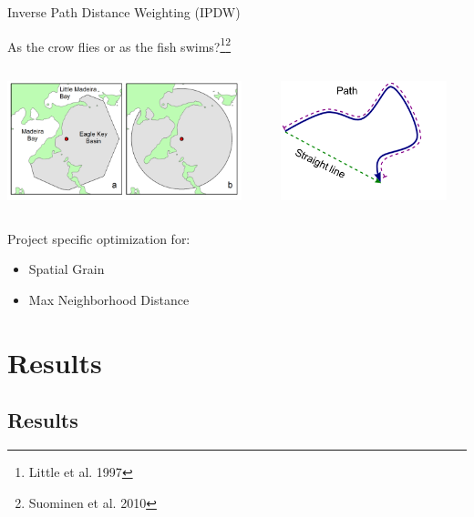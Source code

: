 \documentclass[compress,noflama,nosectionpages]{beamer}
\begin{document}
\begin{frame}{Inverse Path Distance Weighting (IPDW)}

As the crow flies or as the fish swims?\footnote{Little et al. 1997}\footnote[frame]{Suominen et al. 2010}
\vspace{6pt}
 	\begin{columns}
   	\begin{column}{6.8cm}
     	\includegraphics[width=6.8cm,keepaspectratio=true,clip=true,trim= 0mm 0mm 0mm 0mm]{figures/sm-figure1.png}
 		\end{column}
 		
 		\begin{column}{5.4cm}
     	\includegraphics[width=4.8cm,keepaspectratio=true]{images/Picture1.png}
   	\end{column}
 \end{columns}
	Project specific optimization for: 
	\begin{itemize}
		\item{Spatial Grain}
		\item{Max Neighborhood Distance}
	\end{itemize}
	\vspace{4pt}
\end{frame}


\section{Results}
	\subsection{Results}
\end{document}
